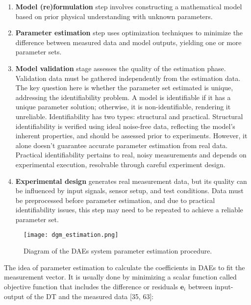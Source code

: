 \begin{enumerate}

    \item \textbf{Model (re)formulation} step involves constructing a mathematical model based on prior physical understanding with unknown parameters.
    
    \item \textbf{Parameter estimation} step uses optimization techniques to minimize the difference between measured data and model outputs, yielding one or more parameter sets.
    
    \item \textbf{Model validation} stage assesses the quality of the estimation phase. Validation data must be gathered independently from the estimation data. The key question here is whether the parameter set estimated is unique, addressing the identifiability problem. A model is identifiable if it has a unique parameter solution; otherwise, it is non-identifiable, rendering it unreliable. Identifiability has two types: structural and practical. Structural identifiability is verified using ideal noise-free data, reflecting the model's inherent properties, and should be assessed prior to experiments. However, it alone doesn't guarantee accurate parameter estimation from real data. Practical identifiability pertains to real, noisy measurements and depends on experimental execution, resolvable through careful experiment design.
    
    \item \textbf{Experimental design} generates real measurement data, but its quality can be influenced by input signals, sensor setup, and test conditions. Data must be preprocessed before parameter estimation, and due to practical identifiability issues, this step may need to be repeated to achieve a reliable parameter set. 
    
\end{enumerate}

\begin{figure*}[htbp]
    \centering
    \texttt{[image: dgm\_estimation.png]}
    \caption{Diagram of the DAEs system parameter estimation procedure.}
    \label{fig:dgm_estimation}
\end{figure*}

The idea of parameter estimation to calculate the coefficients in DAEs to fit the measurement vector. It is usually done by minimizing a scalar function called objective function that includes the difference or residuals $\boldsymbol{e}_i$ between input-output of the DT and the measured data [35, 63]:

